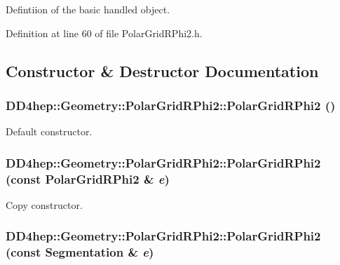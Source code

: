 Defintiion of the basic handled object. 

Definition at line 60 of file PolarGridRPhi2.h.

\subsection{Constructor \& Destructor Documentation}
\hypertarget{class_d_d4hep_1_1_geometry_1_1_polar_grid_r_phi2_a9650d9923ef8f1efdcad95c6ad1b4de9}{
\subsubsection[{PolarGridRPhi2}]{\setlength{\rightskip}{0pt plus 5cm}DD4hep::Geometry::PolarGridRPhi2::PolarGridRPhi2 ()}}
\label{class_d_d4hep_1_1_geometry_1_1_polar_grid_r_phi2_a9650d9923ef8f1efdcad95c6ad1b4de9}


Default constructor. \hypertarget{class_d_d4hep_1_1_geometry_1_1_polar_grid_r_phi2_a50631fa89d469ba5fa053c871d6ac608}{
\subsubsection[{PolarGridRPhi2}]{\setlength{\rightskip}{0pt plus 5cm}DD4hep::Geometry::PolarGridRPhi2::PolarGridRPhi2 (const {\bf PolarGridRPhi2} \& {\em e})}}
\label{class_d_d4hep_1_1_geometry_1_1_polar_grid_r_phi2_a50631fa89d469ba5fa053c871d6ac608}


Copy constructor. \hypertarget{class_d_d4hep_1_1_geometry_1_1_polar_grid_r_phi2_ae6c860e736ccd4a3b167d3c5d1d32e0d}{
\subsubsection[{PolarGridRPhi2}]{\setlength{\rightskip}{0pt plus 5cm}DD4hep::Geometry::PolarGridRPhi2::PolarGridRPhi2 (const {\bf Segmentation} \& {\em e})}}
\label{class_d_d4hep_1_1_geometry_1_1_polar_grid_r_phi2_ae6c860e736ccd4a3b167d3c5d1d32e0d}


